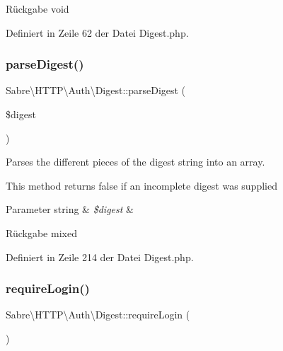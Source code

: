 \begin{DoxyReturn}{Rückgabe}
void 
\end{DoxyReturn}


Definiert in Zeile 62 der Datei Digest.\+php.

\mbox{\label{class_sabre_1_1_h_t_t_p_1_1_auth_1_1_digest_a030fa596c49a9aa42e59c745ab88b91b}} 
\subsubsection{\texorpdfstring{parse\+Digest()}{parseDigest()}}
{\footnotesize\ttfamily Sabre\textbackslash{}\+H\+T\+T\+P\textbackslash{}\+Auth\textbackslash{}\+Digest\+::parse\+Digest (\begin{DoxyParamCaption}\item[{}]{\$digest }\end{DoxyParamCaption})\hspace{0.3cm}{\ttfamily [protected]}}

Parses the different pieces of the digest string into an array.

This method returns false if an incomplete digest was supplied


\begin{DoxyParams}[1]{Parameter}
string & {\em \$digest} & \\
\hline
\end{DoxyParams}
\begin{DoxyReturn}{Rückgabe}
mixed 
\end{DoxyReturn}


Definiert in Zeile 214 der Datei Digest.\+php.

\mbox{\label{class_sabre_1_1_h_t_t_p_1_1_auth_1_1_digest_aedfbedd45800cddf8528fee9a017561f}} 
\subsubsection{\texorpdfstring{require\+Login()}{requireLogin()}}
{\footnotesize\ttfamily Sabre\textbackslash{}\+H\+T\+T\+P\textbackslash{}\+Auth\textbackslash{}\+Digest\+::require\+Login (\begin{DoxyParamCaption}{ }\end{DoxyParamCaption})}

